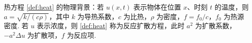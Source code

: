 \documentclass[../main.tex]{subfiles} %
\begin{document}
\begin{remark}
热方程 \eqref{def:heat} 的物理背景：若 $u(x,t)$ 表示物体在位置 $x$、时刻 $t$ 的温度，则 $a=\sqrt{k/(c\rho)}$，其中 $k$ 为导热系数，$c$ 为比热，$\rho$ 为密度，$f=f_0/c$，$f_0$ 为热源密度. 若 $u$ 表示浓度，则 \eqref{def:heat} 称为反应扩散方程，此时 $a^2$ 为扩散系数，$-a^2\Delta u$ 为扩散项，$f$ 为反应项.
\end{remark}




















\end{document}
